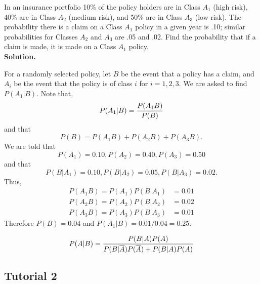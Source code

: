 \documentclass[english, 11pt]{article}
\begin{document}
  \begin{exmp}
     In an insurance portfolio 10\% of the policy holders are in Class $A_1$ (high risk), 40\% are in Class $A_2$ (medium risk), and 50\% are in Class $A_3$ (low risk). The probability there is a claim on a Class $A_1$ policy in a given year is .10; similar probabilities for Classes $A_2$ and $A_3$ are .05 and .02. Find the probability that if a claim is made, it is made on a Class $A_1$ policy. \\

     \textbf{Solution.}

     For a randomly selected policy, let $B$ be the event that a policy has a claim, and $A_i$ be the event that the policy is of class $i$ for $i = 1,2,3$. We are asked to find $P(A_1|B)$. Note that,
     \[ P(A_1 | B) = \frac{P(A_1B)}{P(B)} \]
     and that
     \[ P(B) = P(A_1B) + P(A_2B) + P(A_3B). \]
     We are told that
     \[ P(A_1) = 0.10, P(A_2) = 0.40, P(A_3) = 0.50 \]
     and that
     \[ P(B|A_1) = 0.10, P(B|A_2) = 0.05, P(B|A_3) = 0.02. \]
     Thus,
     \begin{align*}
       P(A_1B) = P(A_1)P(B|A_1) & = 0.01 \\
       P(A_2B) = P(A_2)P(B|A_2) & = 0.02 \\
       P(A_3B) = P(A_3)P(B|A_3) & = 0.01
     \end{align*}
     Therefore $P(B) = 0.04$ and $P(A_1|B) = 0.01/0.04 = 0.25$.
  \end{exmp}

  \begin{thrm}\label{Baye's theorem}
    \[ P(A|B) = \frac{P(B|A)P(A)}{P(B|\overline{A})P(\overline{A})+P(B|A)P(A)} \]
  \end{thrm}

  \subsection{Tutorial 2}
\end{document}

